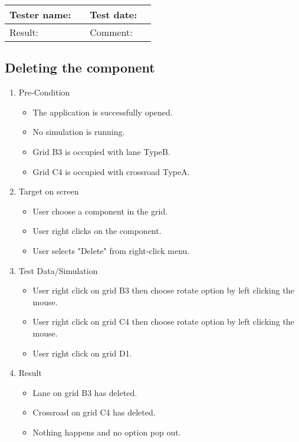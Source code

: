 \begin{tabularx}{\textwidth}{|p{3cm}X|p{3cm}X|}\hline
	Tester name: &  & Test date: & \\\hline
	Result: &   \pass & Comment: & \\\hline
\end{tabularx}

\newpage

\subsection{Deleting the component}

\begin{enumerate}
	\item Pre-Condition
	\begin{itemize}
		\item The application is successfully opened.
		\item No simulation is running.
		\item Grid B3 is occupied with lane TypeB.
		\item Grid C4 is occupied with crossroad TypeA.
	\end{itemize}
	\item Target on screen
	\begin{itemize}
		\item User choose a component in the grid.
		\item User right clicks on the component.
		\item User selects "Delete" from right-click menu.
	\end{itemize}
	\item Test Data/Simulation
	\begin{itemize}
		\item User right click on grid B3 then choose rotate option by left clicking the mouse. 
		\item User right click on grid C4 then choose rotate option by left clicking the mouse.
		\item User right click on grid D1. 
	\end{itemize}
	\item Result
	\begin{itemize}
		\item Lane on grid B3 has deleted.
		\item Crossroad on grid C4 has deleted.
		\item Nothing happens and no option pop out.
	\end{itemize}
\end{enumerate}

